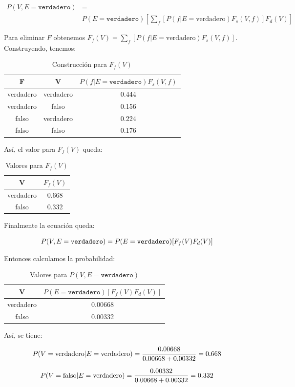 \documentclass[letterpaper,12pt]{article}
\theoremstyle{definition}
\begin{document}
\begin{align*}
P(V,E=\texttt{verdadero})&=\\
&P(E=\texttt{verdadero})[\sum_{f}[P(f|E=\text{verdadero})F_s(V,f)]F_d(V)]
\end{align*}

Para eliminar \(F\) obtenemos \(F_f(V) = \sum_{f}[P(f|E=\text{verdadero})F_s(V,f)]\). Construyendo, tenemos:


\begin{table}[H]
	\centering
	\begin{tabular}{|c|c|c|}
		\toprule
		F & V &  \(P(f|E=\texttt{verdadero})F_s(V,f)\) \\
		\midrule
		verdadero & verdadero & 0.444 \\
		verdadero & falso & 0.156\\
		falso & verdadero & 0.224\\
		falso & falso & 0.176\\
		\bottomrule
	\end{tabular}
	\caption{Construcción para \(F_f(V)\)}
\end{table}

Así, el valor para \(F_f(V)\) queda:


\begin{table}[H]
	\centering
	\begin{tabular}{|c|c|}
		\toprule
		V &  \(F_f(V)\) \\
		\midrule
		verdadero  & 0.668 \\
		falso &  0.332\\
		\bottomrule
	\end{tabular}
	\caption{Valores para \(F_f(V)\)}
\end{table}

Finalmente la ecuación queda:

\begin{equation}
	P(V,E=\texttt{verdadero})=P(E=\texttt{verdadero})[F_f(V)F_d(V)]\\
\end{equation}

Entonces calculamos la probabilidad:

\begin{table}[H]
	\centering
	\begin{tabular}{|c|c|}
		\toprule
		V &  \(P(E=\texttt{verdadero})[F_f(V)F_d(V)]\) \\
		\midrule
		verdadero  & 0.00668 \\
		falso &  0.00332\\
		\bottomrule
	\end{tabular}
	\caption{Valores para \(P(V,E=\texttt{verdadero})\)}
\end{table}

Así, se tiene:

\begin{equation*}
P(V=\text{verdadero}|E=\text{verdadero})=\frac{0.00668}{0.00668+0.00332}= 0.668\\
\end{equation*}

\begin{equation*}
P(V=\text{falso}|E=\text{verdadero})=\frac{0.00332}{0.00668+0.00332}= 0.332\\
\end{equation*}
\end{document}
